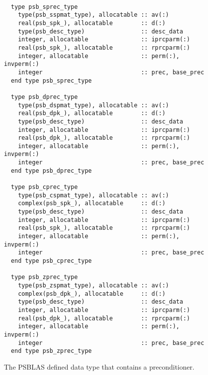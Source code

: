 \begin{figure}[h!]
  \small
  \begin{Sbox}
    \begin{minipage}[tl]{0.9\textwidth}
\begin{verbatim}

  type psb_sprec_type
    type(psb_sspmat_type), allocatable :: av(:) 
    real(psb_spk_), allocatable        :: d(:)  
    type(psb_desc_type)                :: desc_data 
    integer, allocatable               :: iprcparm(:) 
    real(psb_spk_), allocatable        :: rprcparm(:) 
    integer, allocatable               :: perm(:),  invperm(:) 
    integer                            :: prec, base_prec
  end type psb_sprec_type

  type psb_dprec_type
    type(psb_dspmat_type), allocatable :: av(:) 
    real(psb_dpk_), allocatable        :: d(:)  
    type(psb_desc_type)                :: desc_data 
    integer, allocatable               :: iprcparm(:) 
    real(psb_dpk_), allocatable        :: rprcparm(:) 
    integer, allocatable               :: perm(:),  invperm(:) 
    integer                            :: prec, base_prec
  end type psb_dprec_type

  type psb_cprec_type
    type(psb_cspmat_type), allocatable :: av(:) 
    complex(psb_spk_), allocatable     :: d(:)  
    type(psb_desc_type)                :: desc_data 
    integer, allocatable               :: iprcparm(:) 
    real(psb_spk_), allocatable        :: rprcparm(:) 
    integer, allocatable               :: perm(:),  invperm(:) 
    integer                            :: prec, base_prec
  end type psb_cprec_type

  type psb_zprec_type
    type(psb_zspmat_type), allocatable :: av(:) 
    complex(psb_dpk_), allocatable     :: d(:)  
    type(psb_desc_type)                :: desc_data 
    integer, allocatable               :: iprcparm(:) 
    real(psb_dpk_), allocatable        :: rprcparm(:) 
    integer, allocatable               :: perm(:),  invperm(:) 
    integer                            :: prec, base_prec
  end type psb_zprec_type

\end{verbatim}
    \end{minipage}
  \end{Sbox}
  \setlength{\fboxsep}{8pt}
  \begin{center}
    \fbox{\TheSbox}
  \end{center}
  \caption{\label{fig:prectype}The PSBLAS defined data type that contains a preconditioner.}
\end{figure}

